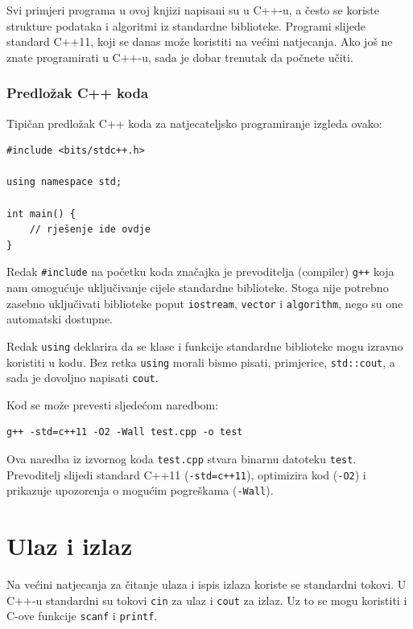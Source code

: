 Svi primjeri programa u ovoj knjizi napisani su u C++-u,
a često se koriste strukture podataka i algoritmi
iz standardne biblioteke.
Programi slijede standard C++11,
koji se danas može koristiti na većini natjecanja.
Ako još ne znate programirati u C++-u,
sada je dobar trenutak da počnete učiti.

\subsubsection{Predložak C++ koda}

Tipičan predložak C++ koda za natjecateljsko programiranje
izgleda ovako:

\begin{lstlisting}
#include <bits/stdc++.h>

using namespace std;

int main() {
    // rješenje ide ovdje
}
\end{lstlisting}

Redak \texttt{\#include} na početku
koda značajka je prevoditelja (compiler) \texttt{g++}
koja nam omogućuje uključivanje cijele standardne biblioteke.
Stoga nije potrebno zasebno uključivati
biblioteke poput \texttt{iostream},
\texttt{vector} i \texttt{algorithm},
nego su one automatski dostupne.

Redak \texttt{using} deklarira
da se klase i funkcije
standardne biblioteke mogu izravno koristiti
u kodu.
Bez retka \texttt{using} morali bismo
pisati, primjerice, \texttt{std::cout},
a sada je dovoljno napisati \texttt{cout}.

Kod se može prevesti sljedećom naredbom:

\begin{lstlisting}
g++ -std=c++11 -O2 -Wall test.cpp -o test
\end{lstlisting}

Ova naredba iz izvornog koda \texttt{test.cpp}
stvara binarnu datoteku \texttt{test}.
Prevoditelj slijedi standard C++11
(\texttt{-std=c++11}),
optimizira kod (\texttt{-O2})
i prikazuje upozorenja o mogućim pogreškama (\texttt{-Wall}).

\section{Ulaz i izlaz}


Na većini natjecanja za čitanje ulaza i ispis izlaza
koriste se standardni tokovi.
U C++-u standardni su tokovi
\texttt{cin} za ulaz i \texttt{cout} za izlaz.
Uz to se mogu koristiti i C-ove funkcije
\texttt{scanf} i \texttt{printf}.

